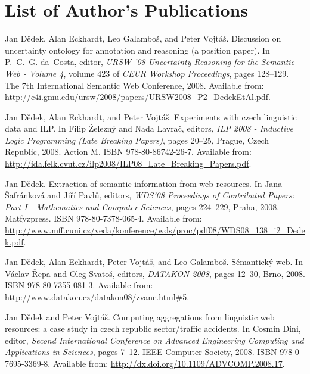 \chapter{List of Author's Publications}

\begin{description}

\item
Jan D{\v{e}}dek, Alan Eckhardt, Leo Galambo{\v{s}}, and Peter
  Vojt{\'{a}}{\v{s}}.
\newblock Discussion on uncertainty ontology for annotation and reasoning (a
  position paper).
\newblock In P.~C.~G. da~Costa, editor, {\em {URSW} '08 Uncertainty Reasoning
  for the Semantic Web - Volume 4}, volume 423 of {\em {CEUR} Workshop
  Proceedings}, pages 128--129. The 7th International Semantic Web Conference,
  2008.
\newblock Available from:
  \url{http://c4i.gmu.edu/ursw/2008/papers/URSW2008_P2_DedekEtAl.pdf}.

\item
Jan D{\v{e}}dek, Alan Eckhardt, and Peter Vojt{\'{a}}{\v{s}}.
\newblock Experiments with czech linguistic data and {ILP}.
\newblock In Filip {\v{Z}}elezn{\'{y}} and Nada Lavra{\v{c}}, editors, {\em
  {ILP} 2008 - Inductive Logic Programming (Late Breaking Papers)}, pages
  20--25, Prague, Czech Republic, 2008. Action M.
\newblock ISBN 978-80-86742-26-7.
\newblock Available from:
  \url{http://ida.felk.cvut.cz/ilp2008/ILP08_Late_Breaking_Papers.pdf}.

\item
Jan D{\v{e}}dek.
\newblock Extraction of semantic information from web resources.
\newblock In Jana {\v{S}}afr{\'{a}}nkov{\'{a}} and Ji{\v{r}}{\'{i}}
  Pavl{\r{u}}, editors, {\em {WDS}'08 Proceedings of Contributed Papers: Part I
  - Mathematics and Computer Sciences}, pages 224--229, Praha, 2008.
  Matfyzpress.
\newblock ISBN 978-80-7378-065-4.
\newblock Available from:
  \url{http://www.mff.cuni.cz/veda/konference/wds/proc/pdf08/WDS08_138_i2_Dedek.pdf}.

\item
Jan D{\v{e}}dek, Alan Eckhardt, Peter Vojt{\'{a}}{\v{s}}, and Leo
  Galambo{\v{s}}.
\newblock S{\'{e}}mantick{\'{y}} web.
\newblock In V{\'{a}}clav {\v{R}}epa and Oleg Svato{\v{s}}, editors, {\em
  {DATAKON} 2008}, pages 12--30, Brno, 2008.
\newblock ISBN 978-80-7355-081-3.
\newblock Available from: \url{http://www.datakon.cz/datakon08/zvane.html#5}.

\item
Jan D{\v{e}}dek and Peter Vojt{\'{a}}{\v{s}}.
\newblock Computing aggregations from linguistic web resources: a case study in
  czech republic sector/traffic accidents.
\newblock In Cosmin Dini, editor, {\em Second International Conference on
  Advanced Engineering Computing and Applications in Sciences}, pages 7--12.
  {IEEE} Computer Society, 2008.
\newblock ISBN 978-0-7695-3369-8.
\newblock Available from: \url{http://dx.doi.org/10.1109/ADVCOMP.2008.17}.


\end{description}
